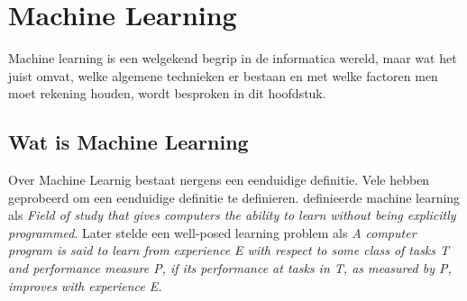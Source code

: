 
\chapter{Machine Learning}\label{Machine Learning}

Machine learning is een welgekend begrip in de informatica wereld, maar wat het juist omvat, welke algemene technieken er bestaan en met welke factoren men moet rekening houden, wordt besproken in dit hoofdstuk.

\section{Wat is Machine Learning}\label{Wat is Machine Learning}

Over Machine Learnig bestaat nergens een eenduidige definitie. Vele hebben geprobeerd om een eenduidige definitie te definieren. \cite{samuel2000some} definieerde machine learning als
\newline
\newline
\textit{Field of study that gives computers the ability to learn without being explicitly programmed}.
\newline
\newline
Later stelde \cite{mitchell1997machine} een well-posed learning problem als 
\newline
\newline
\textit{A computer program is said to learn from experience E with respect to some class of tasks T and performance measure P, if its performance at tasks in T, as measured by P, improves with experience E.}
\newline

